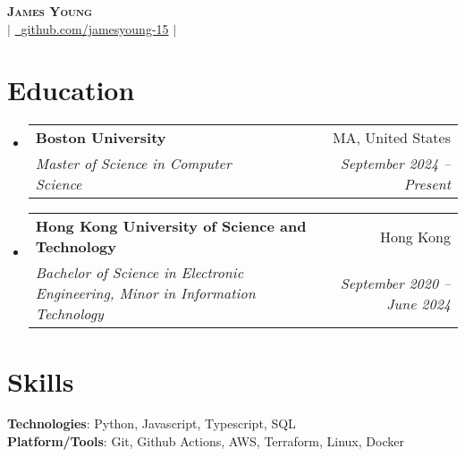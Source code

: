 \documentclass[letterpaper,11pt]{article}
\makeatletter
\newcommand{\resumeItem}[1]{
  \item\small{
    {#1 \vspace{-2pt}}
  }
}
\newcommand{\resumeSubheading}[4]{
  \vspace{-2pt}\item
    \begin{tabular*}{0.97\textwidth}[t]{l@{\extracolsep{\fill}}r}
      \textbf{#1} & #2 \\
      \textit{\small#3} & \textit{\small #4} \\
    \end{tabular*}\vspace{-7pt}
}
\newcommand{\resumeSubHeadingListStart}{\begin{itemize}[leftmargin=0.08in, label={}]}
\newcommand{\resumeSubHeadingListEnd}{\end{itemize}}
\newcommand{\resumeItemListStart}{\begin{itemize}[leftmargin=0.22in]}
\newcommand{\resumeItemListEnd}{\end{itemize}\vspace{-5pt}}
\makeatother
\begin{document}
\begin{center}
    \textbf{\Huge \scshape James Young} \\ \vspace{1pt}
    \small 
    \href{mailto:jamesyoung3931@gmail.com}{} $|$
    \href{https://github.com/jamesyoung-15} {\faGithub\ {github.com/jamesyoung-15}} $|$
    \href{https://jyyoung.com}{}
\end{center}


\section{Education}
  \resumeSubHeadingListStart
    \resumeSubheading
        {Boston University}{MA, United States}
        {Master of Science in Computer Science}{September 2024 -- Present}
    \resumeSubheading
        {Hong Kong University of Science and Technology}{Hong Kong}
        {Bachelor of Science in Electronic Engineering, Minor in Information Technology}{September 2020 -- June 2024}
  \resumeSubHeadingListEnd

\section{Skills}
 \begin{itemize}[leftmargin=0.08in, label={}]
    \small{\item{
     \textbf{Technologies}{: Python, Javascript, Typescript, SQL} \\
     \textbf{Platform/Tools}{: Git, Github Actions, AWS, Terraform, Linux, Docker} \\
    }}
 \end{itemize}
\end{document}
